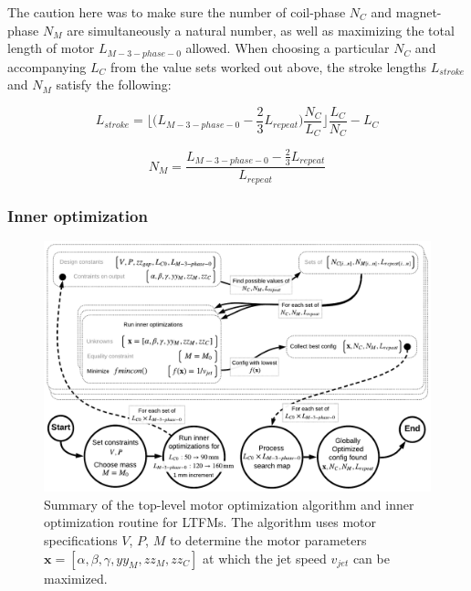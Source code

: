                 
                The caution here was to make sure the number of coil-phase $N_C$ and magnet-phase $N_M$ are simultaneously a natural number, as well as maximizing the total length of motor $L_{M-3-phase-0}$ allowed. When choosing a particular $N_C$ and accompanying $L_C$ from the value sets worked out above, the stroke lengths $L_{stroke}$ and $N_M$ satisfy the following:
    
                
                \begin{equation}
                    L_{stroke} = \Bigg\lfloor \bigg(L_{M-3-phase-0}-\frac{2}{3} L_{repeat}\bigg) \frac{ N_C}{L_C} \Bigg\rfloor \frac{L_C}{N_C}-L_C
                    \label{eq:chap/rsm/LTFM/L_stroke_2}
                \end{equation}
                
                
                \begin{equation}
                    N_M = \frac{L_{M-3-phase-0}-\frac{2}{3} L_{repeat}}{L_{repeat}}
                    \label{eq:chap/rsm/LTFM/N_M}
                \end{equation}


            \subsubsection{Inner optimization}         \label{Chapter:RSM/LTFM/Optimization/Inner}
            
                \begin{figure}[h]
                  \centering
                  \includegraphics[width=5.9in]{chap4/images3/RSM_LTFM_optimization.pdf}
                  \caption{Summary of the top-level motor optimization algorithm and inner optimization routine for \acsp{LTFM}. The algorithm uses motor specifications $V$, $P$, $M$ to determine the motor parameters $\textbf{x}=[\alpha,\beta,\gamma,yy_M,zz_M,zz_C]$ at which the jet speed $v_{jet}$ can be maximized.}
                  \label{fig:chapter/rsm/LTFM/top level optmization}
                \end{figure}
    
